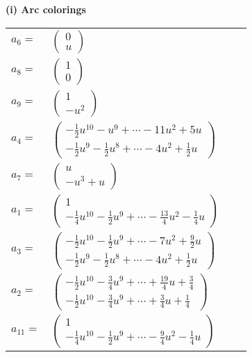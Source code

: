 \documentclass[1p]{elsarticle_modified}
\theoremstyle{definition}
\begin{document}
\flushleft \textbf{(i) Arc colorings}\\
\begin{tabular}{m{7pt} m{180pt} m{7pt} m{180pt} }
\flushright $a_{6}=$&$\begin{pmatrix}0\\u\end{pmatrix}$ \\
\flushright $a_{8}=$&$\begin{pmatrix}1\\0\end{pmatrix}$ \\
\flushright $a_{9}=$&$\begin{pmatrix}1\\- u^2\end{pmatrix}$ \\
\flushright $a_{4}=$&$\begin{pmatrix}-\frac{1}{2} u^{10}- u^9+\cdots-11 u^2+5 u\\-\frac{1}{2} u^9-\frac{1}{2} u^8+\cdots-4 u^2+\frac{1}{2} u\end{pmatrix}$ \\
\flushright $a_{7}=$&$\begin{pmatrix}u\\- u^3+u\end{pmatrix}$ \\
\flushright $a_{1}=$&$\begin{pmatrix}1\\-\frac{1}{4} u^{10}-\frac{1}{2} u^9+\cdots-\frac{13}{4} u^2-\frac{1}{4} u\end{pmatrix}$ \\
\flushright $a_{3}=$&$\begin{pmatrix}-\frac{1}{2} u^{10}-\frac{1}{2} u^9+\cdots-7 u^2+\frac{9}{2} u\\-\frac{1}{2} u^9-\frac{1}{2} u^8+\cdots-4 u^2+\frac{1}{2} u\end{pmatrix}$ \\
\flushright $a_{2}=$&$\begin{pmatrix}-\frac{1}{2} u^{10}-\frac{3}{4} u^9+\cdots+\frac{19}{4} u+\frac{3}{4}\\-\frac{1}{2} u^{10}-\frac{3}{4} u^9+\cdots+\frac{3}{4} u+\frac{1}{4}\end{pmatrix}$ \\
\flushright $a_{11}=$&$\begin{pmatrix}1\\-\frac{1}{4} u^{10}-\frac{1}{2} u^9+\cdots-\frac{9}{4} u^2-\frac{1}{4} u\end{pmatrix}$ \\

\end{tabular}
\end{document}
